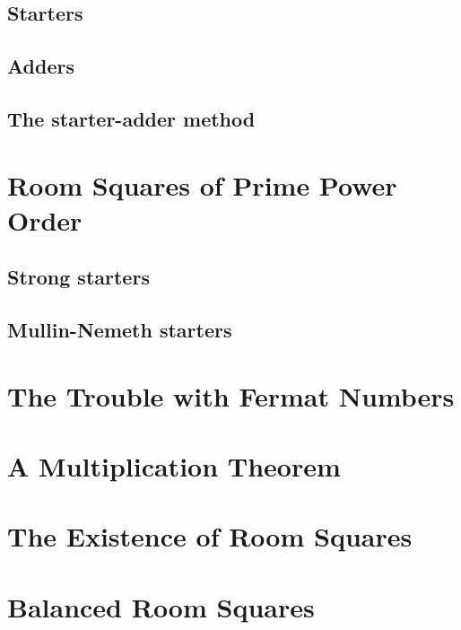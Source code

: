 \documentclass[a4paper, draft]{book}
\begin{document}
  \section{Starters}
    
  \section{Adders}
    
  \section{The starter-adder method}
    

\chapter{Room Squares of Prime Power Order}
  \label{ch:prime-power}
  \section{Strong starters}
    \label{sec:strong-starters}
    
  \section{Mullin-Nemeth starters}
    \label{sec:mullin-nemeth}
    

\chapter{The Trouble with Fermat Numbers}
  \label{ch:trouble-fermat}
  

\chapter{A Multiplication Theorem}
  \label{ch:multiplication-theorem}
  
  

\chapter{The Existence of Room Squares}
  \label{ch:existence-theorem}
  
  

\chapter{Balanced Room Squares}
  \label{ch:balanced-room-squares}
  
\end{document}
